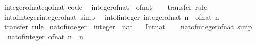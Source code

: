 \begin{isabellebody}
\isatagproof
\isacommand{{\isachardot}{\kern0pt}}\isamarkupfalse%
%
\endisatagproof
{\isafoldproof}%
%
\isadelimproof
\isanewline
%
\endisadelimproof
\isanewline
{}\isamarkupfalse%
\ integer{\isacharunderscore}{\kern0pt}of{\isacharunderscore}{\kern0pt}nat{\isacharunderscore}{\kern0pt}eq{\isacharunderscore}{\kern0pt}of{\isacharunderscore}{\kern0pt}nat\ {\isacharbrackleft}{\kern0pt}code{\isacharbrackright}{\kern0pt}{\isacharcolon}{\kern0pt}\isanewline
\ \ {\isachardoublequoteopen}integer{\isacharunderscore}{\kern0pt}of{\isacharunderscore}{\kern0pt}nat\ {\isacharequal}{\kern0pt}\ of{\isacharunderscore}{\kern0pt}nat{\isachardoublequoteclose}\isanewline
%
\isadelimproof
\ \ %
\endisadelimproof
%
\isatagproof
{}\isamarkupfalse%
\ transfer\ rule%
\endisatagproof
{\isafoldproof}%
%
\isadelimproof
\isanewline
%
\endisadelimproof
\isanewline
{}\isamarkupfalse%
\ int{\isacharunderscore}{\kern0pt}of{\isacharunderscore}{\kern0pt}integer{\isacharunderscore}{\kern0pt}integer{\isacharunderscore}{\kern0pt}of{\isacharunderscore}{\kern0pt}nat\ {\isacharbrackleft}{\kern0pt}simp{\isacharbrackright}{\kern0pt}{\isacharcolon}{\kern0pt}\isanewline
\ \ {\isachardoublequoteopen}int{\isacharunderscore}{\kern0pt}of{\isacharunderscore}{\kern0pt}integer\ {\isacharparenleft}{\kern0pt}integer{\isacharunderscore}{\kern0pt}of{\isacharunderscore}{\kern0pt}nat\ n{\isacharparenright}{\kern0pt}\ {\isacharequal}{\kern0pt}\ of{\isacharunderscore}{\kern0pt}nat\ n{\isachardoublequoteclose}\isanewline
%
\isadelimproof
\ \ %
\endisadelimproof
%
\isatagproof
{}\isamarkupfalse%
\ transfer\ rule%
\endisatagproof
{\isafoldproof}%
%
\isadelimproof
\isanewline
%
\endisadelimproof
\isanewline
{}\isamarkupfalse%
\ nat{\isacharunderscore}{\kern0pt}of{\isacharunderscore}{\kern0pt}integer\ {\isacharcolon}{\kern0pt}{\isacharcolon}{\kern0pt}\ {\isachardoublequoteopen}integer\ {\isasymRightarrow}\ nat{\isachardoublequoteclose}\isanewline
\ \ \ Int{\isachardot}{\kern0pt}nat\isanewline
%
\isadelimproof
\ \ %
\endisadelimproof
%
\isatagproof
\isacommand{{\isachardot}{\kern0pt}}\isamarkupfalse%
%
\endisatagproof
{\isafoldproof}%
%
\isadelimproof
\isanewline
%
\endisadelimproof
\isanewline
{}\isamarkupfalse%
\ nat{\isacharunderscore}{\kern0pt}of{\isacharunderscore}{\kern0pt}integer{\isacharunderscore}{\kern0pt}of{\isacharunderscore}{\kern0pt}nat\ {\isacharbrackleft}{\kern0pt}simp{\isacharbrackright}{\kern0pt}{\isacharcolon}{\kern0pt}\isanewline
\ \ {\isachardoublequoteopen}nat{\isacharunderscore}{\kern0pt}of{\isacharunderscore}{\kern0pt}integer\ {\isacharparenleft}{\kern0pt}of{\isacharunderscore}{\kern0pt}nat\ n{\isacharparenright}{\kern0pt}\ {\isacharequal}{\kern0pt}\ n{\isachardoublequoteclose}\isanewline

\end{isabellebody}
